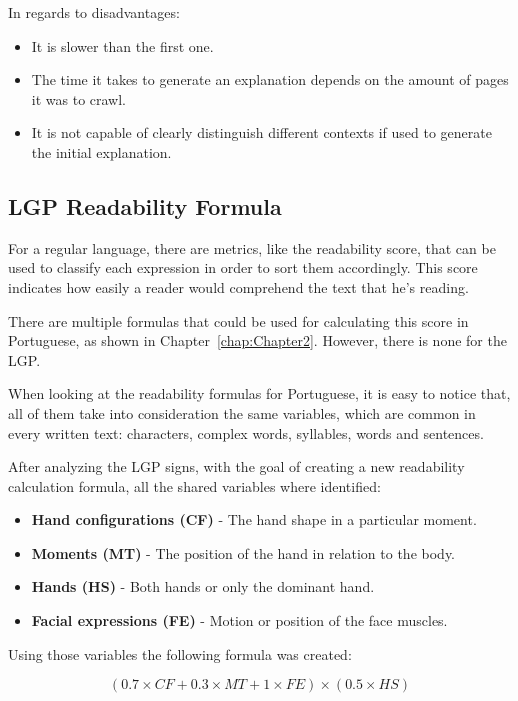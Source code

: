 In regards to disadvantages:
\begin{itemize}
        \item It is slower than the first one.
        \item The time it takes to generate an explanation depends on the amount of pages it was to crawl.
        \item It is not capable of clearly distinguish different contexts if used to generate the initial explanation.
\end{itemize}

\subsection{LGP Readability Formula}

For a regular language, there are metrics, like the readability score, that can be used to classify each expression in order to sort them accordingly.
This score indicates how easily a reader would comprehend the text that he's reading.

There are multiple formulas that could be used for calculating this score in Portuguese, as shown in Chapter~\ref{chap:Chapter2}.
However, there is none for the \gls{LGP}.

When looking at the readability formulas for Portuguese, it is easy to notice that, all of them take into consideration the same variables, which are common in every written text: characters, complex words, syllables, words and sentences.

After analyzing the \gls{LGP} signs, with the goal of creating a new readability calculation formula, all the shared variables where identified:

\begin{itemize}
    \item \textbf{Hand configurations (CF)} - The hand shape in a particular moment.
    \item \textbf{Moments (MT)} - The position of the hand in relation to the body.
    \item \textbf{Hands (HS)} - Both hands or only the dominant hand.
    \item \textbf{Facial expressions (FE)} - Motion or position of the face muscles.
\end{itemize}

Using those variables the following formula was created:

\begin{equation}
(0.7 \times CF + 0.3 \times MT + 1 \times FE) \times (0.5 \times HS)
\label{wordScore}
\end{equation}

